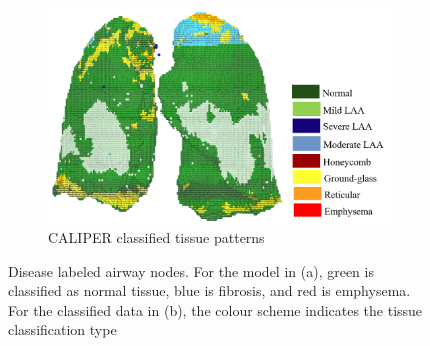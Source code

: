 \begin{figure}[htbp]
\begin{subfigure}{.51\linewidth}%
  \includegraphics[width=\linewidth,trim={{.0\wd0} {.0\wd0} {.0\wd0} {.0\wd0}},clip]{ModelBasedAnalysis/Image/IPF501_CAPLIPERClassifiedData_colorbar.png}
  \caption{CALIPER classified tissue patterns}
  \label{fig:DiseaseLabeling-b} 
\end{subfigure}
\caption{Disease labeled airway nodes. For the model in (a), green is classified as normal tissue, blue is fibrosis, and red is emphysema. For the classified data in (b), the colour scheme indicates the tissue classification type}
\label{fig:DiseaseLabeling}
\end{figure}


